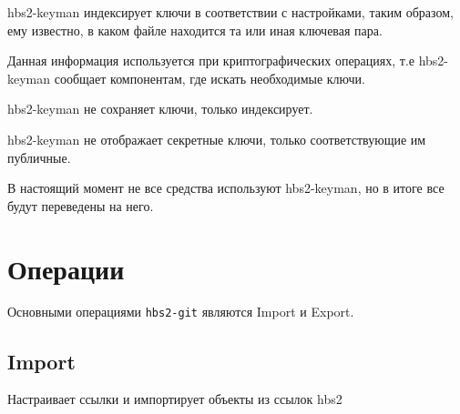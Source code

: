 \documentclass[11pt,a4paper]{article}
\begin{document}
hbs2-keyman индексирует ключи в соответствии с настройками, таким образом,
ему известно, в каком файле находится та или иная ключевая пара.

Данная информация используется при криптографических операциях, т.е
hbs2-keyman сообщает компонентам, где искать необходимые ключи.

hbs2-keyman не сохраняет ключи, только индексирует.

hbs2-keyman не отображает секретные ключи, только соответствующие им публичные.

В настоящий момент не все средства используют hbs2-keyman, но в итоге все
будут переведены на него.



\section{Операции}

Основными операциями \texttt{hbs2-git} являются Import и Export.

\subsection{Import}

Настраивает ссылки и импортирует объекты из ссылок hbs2
\end{document}

